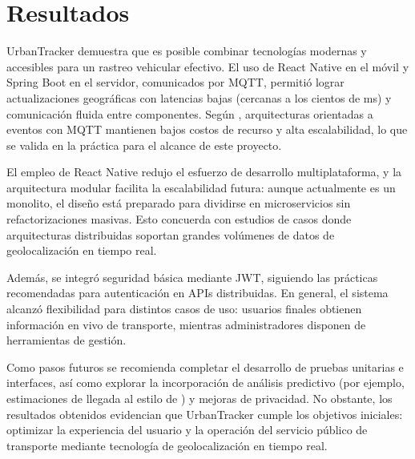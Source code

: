 \section{Resultados}
UrbanTracker demuestra que es posible combinar tecnologías modernas y accesibles para un rastreo vehicular efectivo. El uso de React Native en el móvil y Spring Boot en el servidor, comunicados por MQTT, permitió lograr actualizaciones geográficas con latencias bajas (cercanas a los cientos de ms) y comunicación fluida entre componentes. Según \cite{villagra2021mqtt}, arquitecturas orientadas a eventos con MQTT mantienen bajos costos de recurso y alta escalabilidad, lo que se valida en la práctica para el alcance de este proyecto.

El empleo de React Native redujo el esfuerzo de desarrollo multiplataforma, y la arquitectura modular facilita la escalabilidad futura: aunque actualmente es un monolito, el diseño está preparado para dividirse en microservicios sin refactorizaciones masivas. Esto concuerda con estudios de casos donde arquitecturas distribuidas soportan grandes volúmenes de datos de geolocalización en tiempo real.

Además, se integró seguridad básica mediante JWT, siguiendo las prácticas recomendadas para autenticación en APIs distribuidas. En general, el sistema alcanzó flexibilidad para distintos casos de uso: usuarios finales obtienen información en vivo de transporte, mientras administradores disponen de herramientas de gestión.

Como pasos futuros se recomienda completar el desarrollo de pruebas unitarias e interfaces, así como explorar la incorporación de análisis predictivo (por ejemplo, estimaciones de llegada al estilo de \cite{juric2021predictivo}) y mejoras de privacidad. No obstante, los resultados obtenidos evidencian que UrbanTracker cumple los objetivos iniciales: optimizar la experiencia del usuario y la operación del servicio público de transporte mediante tecnología de geolocalización en tiempo real.